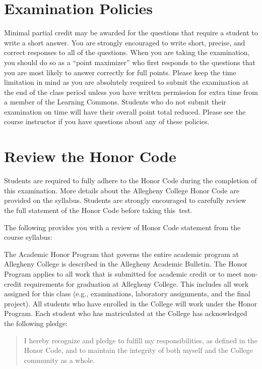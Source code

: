 \section*{Examination Policies}

\vspace*{-.05in}
\noindent Minimal partial credit may be awarded for the questions that require a student to write a short answer. You
are strongly encouraged to write short, precise, and correct responses to all of the questions. When you are taking the
examination, you should do so as a ``point maximizer'' who first responds to the questions that you are most likely to
answer correctly for full points. Please keep the time limitation in mind as you are absolutely required to submit the
examination at the end of the class period unless you have written permission for extra time from a member of the
Learning Commons. Students who do not submit their examination on time will have their overall point total reduced.
Please see the course instructor if you have questions about any of these policies.

\vspace*{-.2in}
\section*{Review the Honor Code}
\vspace*{-.1in}

\noindent Students are required to fully adhere to the Honor Code during the completion of this examination. More
details about the Allegheny College Honor Code are provided on the syllabus. Students are strongly encouraged to
carefully review the full statement of the Honor Code before taking \mbox{this test}.

\noindent The following provides you with a review of Honor Code statement from the course syllabus:

The Academic Honor Program that governs the entire academic program at Allegheny College is described in the Allegheny
Academic Bulletin.  The Honor Program applies to all work that is submitted for academic credit or to meet non-credit
requirements for graduation at Allegheny College.  This includes all work assigned for this class (e.g., examinations,
laboratory assignments, and the final project).  All students who have enrolled in the College will work under the Honor
Program.  Each student who has matriculated at the College has acknowledged the following pledge:

\vspace*{-.11in}
\begin{quote}
  I hereby recognize and pledge to fulfill my responsibilities, as defined in the Honor Code, and to maintain the
  integrity of both myself and the College community as a whole.
\end{quote}
\vspace*{-.11in}

